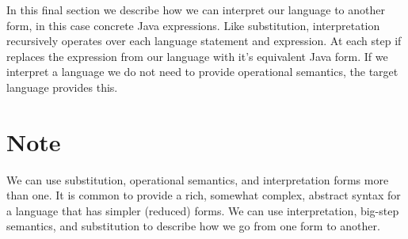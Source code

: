 \documentclass[10pt,a4paper,british,final]{article}
\begin{document}
In this final section we describe how we can interpret our language to another form, in this case concrete Java expressions.
Like substitution, interpretation recursively operates over each language statement and expression.
At each step if replaces the expression from our language with it's equivalent Java form.
If we interpret a language we do not need to provide operational semantics, the target language provides this.

\section{Note}

We can use substitution, operational semantics, and interpretation forms more than one.
It is common to provide a rich, somewhat complex, abstract syntax for a language that has simpler (reduced) forms.
We can use interpretation, big-step semantics, and substitution to describe how we go from one form to another.
\end{document}
